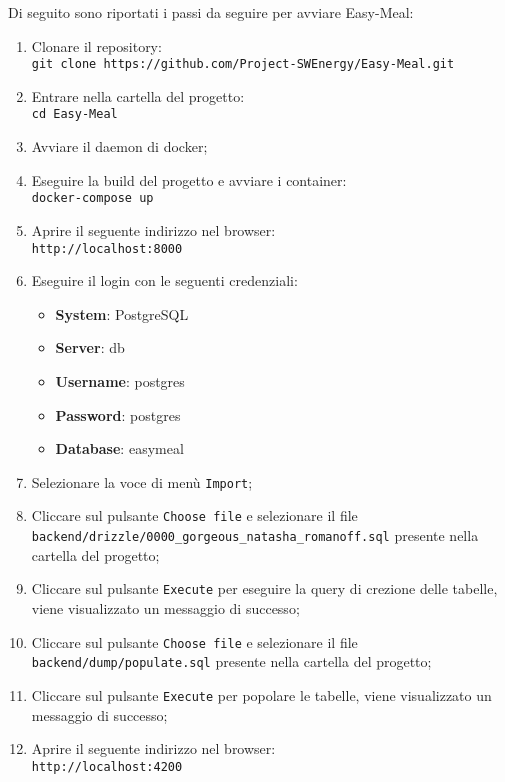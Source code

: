 Di seguito sono riportati i passi da seguire per avviare Easy-Meal:
\begin{enumerate}
	\item Clonare il repository: \\
		\texttt{git clone https://github.com/Project-SWEnergy/Easy-Meal.git}

	\item Entrare nella cartella del progetto: \\
		\texttt{cd Easy-Meal}

	\item Avviare il daemon di docker;

	\item Eseguire la build del progetto e avviare i container: \\
		\texttt{docker-compose up}

	\item Aprire il seguente indirizzo nel browser: \\
		\texttt{http://localhost:8000}

	\item Eseguire il login con le seguenti credenziali:
		\begin{itemize}
			\item \textbf{System}: PostgreSQL
			\item \textbf{Server}: db
			\item \textbf{Username}: postgres
			\item \textbf{Password}: postgres
			\item \textbf{Database}: easymeal
		\end{itemize}

	\item Selezionare la voce di menù \texttt{Import};

	\item Cliccare sul pulsante \texttt{Choose file} e selezionare il file
		\texttt{backend/drizzle/0000\_gorgeous\_natasha\_romanoff.sql} presente 
		nella cartella del progetto;

	\item Cliccare sul pulsante \texttt{Execute} per eseguire la query di
		crezione delle tabelle, viene visualizzato un messaggio di successo;

	\item Cliccare sul pulsante \texttt{Choose file} e selezionare il file
		\texttt{backend/dump/populate.sql} presente nella cartella del 
		progetto;

	\item Cliccare sul pulsante \texttt{Execute} per popolare le tabelle, viene
		visualizzato un messaggio di successo;

	\item Aprire il seguente indirizzo nel browser: \\ 
		\texttt{http://localhost:4200}
\end{enumerate}

